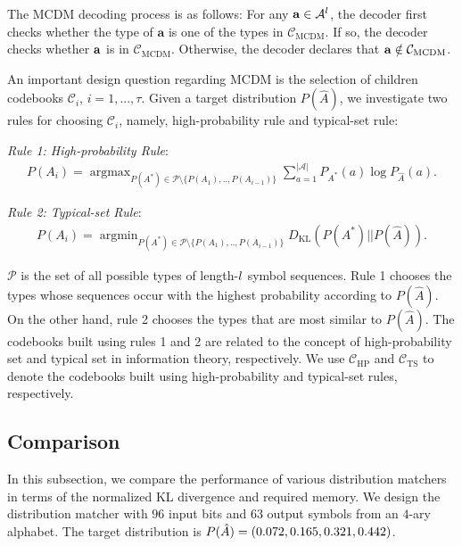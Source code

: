 \documentclass [PhD] {uclathes}
\DeclareMathOperator*{\argmax}{argmax}
\DeclareMathOperator*{\argminB}{argmin}   %
\begin{document}
The MCDM decoding process is as follows: For any $\mathbf{a}\in\mathcal{A}^{l}$, the decoder first checks whether
the type of $\mathbf{a}$ is one of the types in $\mathcal{C}_{\mathrm{MCDM}}$.  
If so, the decoder checks whether $\mathbf{a}$ is in $\mathcal{C}_{\mathrm{MCDM}}$. 
Otherwise, the decoder declares that $\mathbf{a}\notin \mathcal{C}_{\mathrm{MCDM}}$.

An important design question regarding MCDM is the selection of children codebooks $\mathcal{C}_i$, $i=1,...,\tau$. Given a target distribution $P(\hat{A})$, we investigate two rules for choosing $\mathcal{C}_i$, namely, high-probability rule and typical-set rule:

\emph{Rule 1: High-probability Rule}:
\begin{align} 
    P(A_i)=\argmax_{P(A^*)\in\mathcal{P}\setminus \{P(A_1),..,P(A_{i-1})\}}\sum_{a=1}^{|\mathcal{A}|} P_{A^*}(a)\log P_{\hat{A}}(a).
\end{align}

\emph{Rule 2: Typical-set Rule}:
\begin{align}   
    P(A_i)=\argminB_{P(A^*)\in\mathcal{P}\setminus \{P(A_1),..,P(A_{i-1})\}}{D_\mathrm{KL}}(P(A^*)||P(\hat{A})).
\end{align}


$\mathcal{P}$ is the set of all possible types of length-$l$ symbol sequences. Rule 1 chooses the types whose sequences occur with the highest probability according to $P(\hat{A})$. On the other hand, rule 2 chooses the types that are most similar to $P(\hat{A})$. The codebooks built using rules 1 and 2 are related to the concept of high-probability set and typical set in information theory\cite [Chapter 3.3] {thomas2006elements}, respectively. 
We use $\mathcal{C}_{\mathrm{HP}}$ and $\mathcal{C}_{\mathrm{TS}}$ to denote the codebooks built using high-probability and typical-set rules, respectively. 


\subsection{Comparison}
In this subsection, we compare the performance of various distribution matchers in terms of the normalized KL divergence and required memory. We design the distribution matcher with $96$ input bits and $63$ output symbols from an $4$-ary alphabet. The target distribution is $P({\hat{A}})=(0.072,0.165,\allowdisplaybreaks 0.321,0.442)$. 
\end{document}
